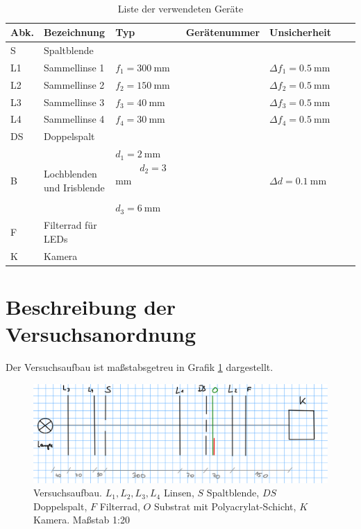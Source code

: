 \documentclass{article}
\begin{document}
\begin{table}[H]
\caption{Liste der verwendeten Geräte}

~

\begin{tabular}{l|p{3cm}p{3cm}llll}
Abk. & Bezeichnung  & Typ & Gerätenummer & Unsicherheit \\
\hline
S & Spaltblende \\
\hline
L1 & Sammellinse 1 & $f_1 = 300~$mm & & $\Delta f_1 = 0.5~$mm \\
\hline
L2 & Sammellinse 2 & $f_2 = 150~$mm & & $\Delta f_2 = 0.5~$mm \\
\hline
L3 & Sammellinse 3 & $f_3 = 40~$mm & & $\Delta f_3 = 0.5~$mm \\
\hline
L4 & Sammellinse 4 & $f_4 = 30~$mm & & $\Delta f_4 = 0.5~$mm \\
\hline
DS & Doppelspalt \\
\hline





B & Lochblenden und Irisblende & $d_1=2~$mm ~ ~ ~ ~ $d_2=3~$mm   ~~~~~~~~~~~~ $d_3=6~$mm & &  $\Delta d = 0.1~$mm \\
\hline
F & Filterrad für LEDs & \\
\hline
K & Kamera
\end{tabular}

\end{table}



\section{Beschreibung der Versuchsanordnung}

Der Versuchsaufbau ist maßstabsgetreu in Grafik \ref{fig:aufbau} dargestellt.
\begin{figure}[H]
\caption{Versuchsaufbau. $L_1,L_2,L_3,L_4$ Linsen, $S$ Spaltblende, $DS$ Doppelspalt, $F$ Filterrad, $O$ Substrat mit Polyacrylat-Schicht, $K$ Kamera. Maßstab 1:20}
\label{fig:aufbau}
\includegraphics[scale=1]{aufbau.png}
\end{figure}
\end{document}

